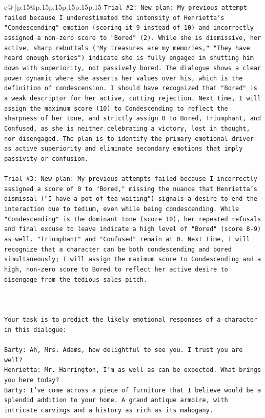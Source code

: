 \documentclass{article}
\begin{document}
{\begin{supertabular}{c@{$\;$}|p{.15\linewidth}@{}p{.15\linewidth}p{.15\linewidth}p{.15\linewidth}p{.15\linewidth}p{.15\linewidth}}
{{{\texttt{Trial \#2: New plan: My previous attempt failed because I underestimated the intensity of Henrietta's "Condescending" emotion (scoring it 9 instead of 10) and incorrectly assigned a non{-}zero score to "Bored" (2). While she is dismissive, her active, sharp rebuttals ("My treasures are my memories," "They have heard enough stories") indicate she is fully engaged in shutting him down with superiority, not passively bored. The dialogue shows a clear power dynamic where she asserts her values over his, which is the definition of condescension. I should have recognized that "Bored" is a weak descriptor for her active, cutting rejection. Next time, I will assign the maximum score (10) to Condescending to reflect the sharpness of her tone, and strictly assign 0 to Bored, Triumphant, and Confused, as she is neither celebrating a victory, lost in thought, nor disengaged. The plan is to identify the primary emotional driver as active superiority and eliminate secondary emotions that imply passivity or confusion.} \\
\\ 
\texttt{Trial \#3: New plan: My previous attempts failed because I incorrectly assigned a score of 0 to "Bored," missing the nuance that Henrietta's dismissal ("I have a pot of tea waiting") signals a desire to end the interaction due to tedium, even while being condescending. While "Condescending" is the dominant tone (score 10), her repeated refusals and final excuse to leave indicate a high level of "Bored" (score 8{-}9) as well. "Triumphant" and "Confused" remain at 0. Next time, I will recognize that a character can be both condescending and bored simultaneously; I will assign the maximum score to Condescending and a high, non{-}zero score to Bored to reflect her active desire to disengage from the tedious sales pitch.} \\
\\ 
\\ 
\\ 
\texttt{Your task is to predict the likely emotional responses of a character in this dialogue:} \\
\\ 
\texttt{Barty: Ah, Mrs. Adams, how delightful to see you. I trust you are well?} \\
\texttt{Henrietta: Mr. Harrington, I'm as well as can be expected. What brings you here today?} \\
\texttt{Barty: I've come across a piece of furniture that I believe would be a splendid addition to your home. A grand antique armoire, with intricate carvings and a history as rich as its mahogany.} \\
}}}
\end{supertabular}}
\end{document}
